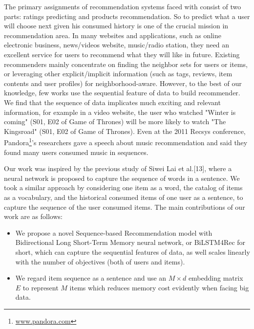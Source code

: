 \documentclass[runningheads]{llncs}
\begin{document}
The primary assignments of recommendation systems faced with consist of two parts: ratings predicting and products recommendation. So to predict what a user will choose next given his consumed history is one of the crucial mission \cite{Wan2015NextBR} in recommendation area. In many websites and applications, such as online electronic business, news/videos website, music/radio station, they need an excellent service for users to recommend what they will like in future. Existing recommenders mainly concentrate on finding the neighbor sets for users or items, or leveraging other explicit/implicit information (such as tags, reviews, item contents and user profiles) for neighborhood-aware. However, to the best of our knowledge, few works use the sequential feature of data to build recommender. We find that the sequence of data implicates much exciting and relevant information, for example in a video website, the user who watched "Winter is coming" (S01, E02 of Game of Thrones) will be more likely to watch "The Kingsroad" (S01, E02 of Game of Thrones). Even at the 2011 Recsys conference, Pandora\footnote{\url{www.pandora.com}}'s researchers gave a speech about music recommendation and said they found many users consumed music in sequences.

Our work was inspired by the previous study of Siwei Lai et al.[13], where a neural network is proposed to capture the sequence of words in a sentence.  We took a similar approach by considering one item as a word, the catalog of items as a vocabulary, and the historical consumed items of one user as a sentence, to capture the sequence of the user consumed items. The main contributions of our work are as follows:
 \begin{itemize}

\item We propose a novel Sequence-based Recommendation model with Bidirectional Long Short-Term Memory neural network,  or BiLSTM4Rec for short, which can capture the sequential features of data, as well scales linearly with the number of objectives (both of users and items).
\item We regard item sequence as a sentence and use an $M\times d$ embedding matrix $E$ to represent $M$ items which reduces memory cost evidently when facing big data.
 \end{itemize}

\end{document}
